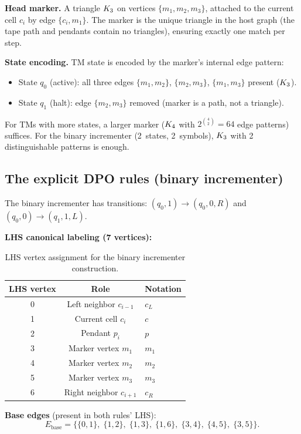 \documentclass{../shared/primo}
\begin{document}
\textbf{Head marker.} A triangle $K_{3}$ on vertices $\{m_1, m_2, m_3\}$, attached to the current cell $c_i$ by edge $\{c_i, m_1\}$. The marker is the unique triangle in the host graph (the tape path and pendants contain no triangles), ensuring exactly one match per step.

\textbf{State encoding.} TM state is encoded by the marker's internal edge pattern:
\begin{itemize}
\item State $q_0$ (active): all three edges $\{m_1,m_2\}$, $\{m_2,m_3\}$, $\{m_1,m_3\}$ present ($K_{3}$).
\item State $q_1$ (halt): edge $\{m_2,m_3\}$ removed (marker is a path, not a triangle).
\end{itemize}
For TMs with more states, a larger marker ($K_{4}$ with $2^{\binom{4}{2}} = 64$ edge patterns) suffices. For the binary incrementer (2~states, 2~symbols), $K_{3}$ with 2 distinguishable patterns is enough.

\subsection{The explicit DPO rules (binary incrementer)}
\label{sec:bininc}

The binary incrementer has transitions: $(q_0, 1) \to (q_0, 0, R)$ and $(q_0, 0) \to (q_1, 1, L)$.

\textbf{LHS canonical labeling (7 vertices):}

\begin{table}[ht]
\centering
\begin{tabular}{ccl}
\toprule
LHS vertex & Role & Notation \\
\midrule
0 & Left neighbor $c_{i-1}$ & $c_L$ \\
1 & Current cell $c_i$ & $c$ \\
2 & Pendant $p_i$ & $p$ \\
3 & Marker vertex $m_1$ & $m_1$ \\
4 & Marker vertex $m_2$ & $m_2$ \\
5 & Marker vertex $m_3$ & $m_3$ \\
6 & Right neighbor $c_{i+1}$ & $c_R$ \\
\bottomrule
\end{tabular}
\caption{LHS vertex assignment for the binary incrementer construction.}
\label{tab:lhs}
\end{table}

\textbf{Base edges} (present in both rules' LHS):
\[
E_{\text{base}} = \bigl\{\{0,1\},\; \{1,2\},\; \{1,3\},\; \{1,6\},\; \{3,4\},\; \{4,5\},\; \{3,5\}\bigr\}.
\]
\end{document}

